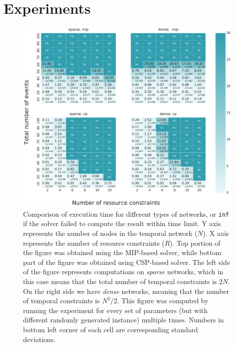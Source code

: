 \section{Experiments}

\begin{figure}
\begin{center}
\includegraphics[width=\textwidth]{execution_time_std}
\caption{Comporison of execution time for different types of networks, or \texttt{inf} if the solver failed to compute the result within time limit. Y axis represents the number of nodes in the temporal network ($N$). X axis represents the number of resource constraints ($R$). Top portion of the figure was obtained using the MIP-based solver, while bottom part of the figure was obtained using CSP-based solver. The left side of the figure represents computations on \textit{sparse} networks, which in this case means that the total number of temporal constraints is $2N$. On the right side we have \textit{dense} networks, meaning that the number of temporal constraints is $N^2/2$. This figure was computed by running the experiment for every set of parameters (but with different randomly generated instance) multiple times. Numbers in bottom left corner of each cell are corresponding standard deviations.}
\label{fig:execution_time}
\end{center}
\end{figure}

